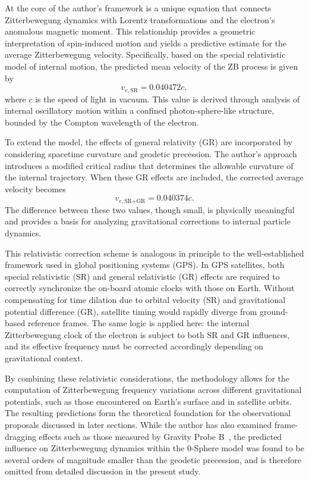 \documentclass[%
 reprint,
 amsmath,amssymb,
 aps,
]{revtex4-1}
\numberwithin{equation}{section}%
\begin{document}
At the core of the author's framework is a unique equation that connects Zitterbewegung dynamics with Lorentz transformations and the electron's anomalous magnetic moment. This relationship provides a geometric interpretation of spin-induced motion and yields a predictive estimate for the average Zitterbewegung velocity. Specifically, based on the special relativistic model of internal motion, the predicted mean velocity of the ZB process is given by
\begin{equation}
v_{e,\text{SR}} = 0.040472c,
\end{equation}
where $c$ is the speed of light in vacuum. This value is derived through analysis of internal oscillatory motion within a confined photon-sphere-like structure, bounded by the Compton wavelength of the electron.

To extend the model, the effects of general relativity (GR) are incorporated by considering spacetime curvature and geodetic precession. The author's approach introduces a modified critical radius that determines the allowable curvature of the internal trajectory. When these GR effects are included, the corrected average velocity becomes
\begin{equation}
v_{e,\text{SR+GR}} = 0.040374c.
\end{equation}
The difference between these two values, though small, is physically meaningful and provides a basis for analyzing gravitational corrections to internal particle dynamics.

This relativistic correction scheme is analogous in principle to the well-established framework used in global positioning systems (GPS). In GPS satellites, both special relativistic (SR) and general relativistic (GR) effects are required to correctly synchronize the on-board atomic clocks with those on Earth. Without compensating for time dilation due to orbital velocity (SR) and gravitational potential difference (GR), satellite timing would rapidly diverge from ground-based reference frames. The same logic is applied here: the internal Zitterbewegung clock of the electron is subject to both SR and GR influences, and its effective frequency must be corrected accordingly depending on gravitational context.

By combining these relativistic considerations, the methodology allows for the computation of Zitterbewegung frequency variations across different gravitational potentials, such as those encountered on Earth's surface and in satellite orbits. The resulting predictions form the theoretical foundation for the observational proposals discussed in later sections. While the author has also examined frame-dragging effects such as those measured by Gravity Probe B~\cite{everitt2011}, the predicted influence on Zitterbewegung dynamics within the 0-Sphere model was found to be several orders of magnitude smaller than the geodetic precession, and is therefore omitted from detailed discussion in the present study.
\end{document}
